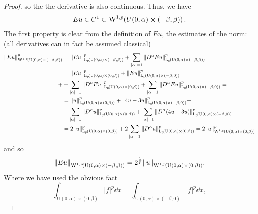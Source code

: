 \documentclass{article}
\begin{document}
\begin{proof}
	so the the derivative is also continuous. Thus, we have
	\[
		Eu  \in C^1 \subset \WkpSet[1][p]{U(0,\alpha) \cross (-\beta,\beta)}.
	\]
	The first property is clear from the definition of $Eu$, the estimates of the norm: (all derivatives can in fact be assumed classical)
	\begin{align*}
		\norm{Eu}_{\WkpSet[1][p]{\text{U}(0,\alpha) \times (-\beta,\beta)}}^p &= \norm{Eu}_{\LpSet{\text{U}(0,\alpha)\times (-\beta,\beta)}}^p + \sum_{|\alpha| = 1}\norm{D^{\alpha}Eu}_{\LpSet{\text{U}(0,\alpha)\times (-\beta, \beta)}}^p = \\
		&= \norm{Eu}_{\LpSet{\text{U}(0,\alpha) \times (0,\beta)}}^p +\norm{Eu}_{\LpSet{\text{U}(0,\alpha) \times (-\beta,0)}}^p \\ +
		& + \sum_{|\alpha| = 1}\norm{D^{\alpha}Eu}_{\LpSet{\text{U}(0,\alpha)\times (0, \beta)}}^p + \sum_{|\alpha| = 1}\norm{D^{\alpha}Eu}_{\LpSet{\text{U}(0,\alpha)\times (-\beta, 0)}}^p = \\
		& = \norm{u}_{\LpSet{\text{U}(0,\alpha)\times (0,\beta)}}^p + \norm{4u - 3u}_{\LpSet{\text{U}(0,\alpha)\times (-\beta, 0)}}^p + \\
		& + \sum_{|\alpha| = 1}\norm{D^{\alpha}u}_{\LpSet{\text{U}(0,\alpha)\times (0,\beta)}}^p + \sum_{|\alpha| =1}\norm{D^{\alpha}\qty(4u - 3u)}_{\LpSet{\text{U}(0,\alpha)\times (-\beta,0)}}^p \\
		&= 2 \norm{u}_{\LpSet{\text{U}(0,\alpha)\times (0,\beta)}}^p + 2 \sum_{|\alpha| =1}\norm{D^{\alpha}u}_{\LpSet{\text{U}(0,\alpha)\times (0,\beta)}}^p = 2 \norm{u}_{\WkpSet{\text{U}(0,\alpha)\times (0,\beta)}}^p
	\end{align*}
	and so
	\[
		\norm{Eu}_{\WkpSet[1][p]{\text{U}(0,\alpha)\times (-\beta,\beta)}} = 2^{\frac{1}{p}} \norm{u}_{\WkpSet[1][p]{\text{U}(0,\alpha)\times (0,\beta)}}.
	\]
	Where we have used the obvious fact
	\[
		\int_{\text{U}(0,\alpha)\times (0,\beta)}|f|^p\dd{x} = \int_{\text{U}(0,\alpha)\times (-\beta,0)}|f|^p\dd{x},
	\]


\end{proof}
\end{document}
